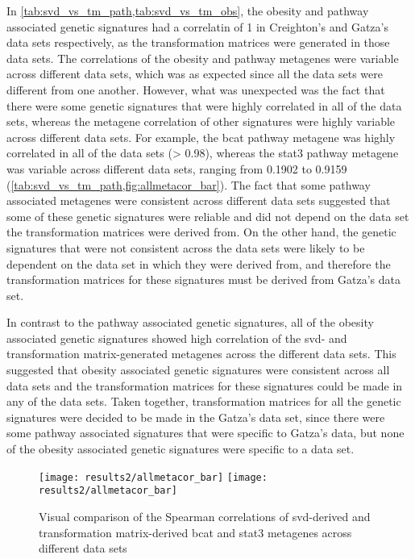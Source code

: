 In \cref{tab:svd_vs_tm_path,tab:svd_vs_tm_obs}, the obesity and pathway associated genetic signatures had a correlatin of 1 in Creighton's and Gatza's data sets respectively, as the transformation matrices were generated in those data sets.
The correlations of the obesity and pathway metagenes were variable across different data sets, which was as expected since all the data sets were different from one another.
However, what was unexpected was the fact that there were some genetic signatures that were highly correlated in all of the data sets, whereas the metagene correlation of other signatures were highly variable across different data sets.
For example, the \gls{bcat} pathway metagene was highly correlated in all of the data sets (\textgreater{} 0.98), whereas the \gls{stat3} pathway metagene was variable across different data sets, ranging from 0.1902 to 0.9159 (\cref{tab:svd_vs_tm_path,fig:allmetacor_bar}).
The fact that some pathway associated metagenes were consistent across different data sets suggested that some of these genetic signatures were reliable and did not depend on the data set the transformation matrices were derived from.
On the other hand, the genetic signatures that were not consistent across the data sets were likely to be dependent on the data set in which they were derived from, and therefore the transformation matrices for these signatures must be derived from Gatza's data set.

In contrast to the pathway associated genetic signatures, all of the obesity associated genetic signatures showed high correlation of the \gls{svd}- and transformation matrix-generated metagenes across the different data sets.
This suggested that obesity associated genetic signatures were consistent across all data sets and the transformation matrices for these signatures could be made in any of the data sets.
Taken together, transformation matrices for all the genetic  signatures were decided to be made in the Gatza's data set, since there were some pathway associated signatures that were specific to Gatza's data, but none of the obesity associated genetic signatures were specific to a data set.
\\

\begin{figure}[htpb]
	\centering
	\texttt{[image: results2/allmetacor\_bar]}
	\texttt{[image: results2/allmetacor\_bar]}
	\caption{Visual comparison of the Spearman correlations of \gls{svd}-derived and transformation matrix-derived \gls{bcat} and \gls{stat3} metagenes across different data sets}
	\label{fig:allmetacor_bar}
\end{figure}

